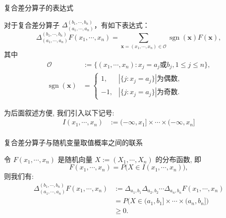 \documentclass[Prob-All.tex]{subfiles}
\begin{document}
\begin{frame}{复合差分算子的表达式}
\begin{thm}
对于复合差分算子 $\Delta_{\left(a_{1}, \cdots, a_{n}\right)}^{\left(b_{1}, \cdots, b_{n}\right)}$，有如下表达式：
$$\Delta_{\left(a_{1}, \cdots, a_{n}\right)}^{\left(b_{1}, \cdots, b_{n}\right)} F(x_1,\cdots,x_n)=\sum_{\boldsymbol{x}=(x_1,\cdots, x_n)\in\mathcal{O}} \operatorname{sgn}(\boldsymbol{x}) F(\boldsymbol{x}),$$
			其中 \vspace{-0.5cm}
			\begin{align*}
				\mathcal{O}&:=\{(x_1,\cdots,x_n): x_j=a_j\mbox{或} b_j, 1\leq j\leq n\},\\
				\operatorname{sgn}(\boldsymbol{x})&=\left\{
				\begin{array}{ll}
					1,& |\{j:x_j=a_j\}|\mbox{为偶数},\\
					-1, &|\{j:x_j=a_j\}|\mbox{为奇数}.
					\end{array}\right.
			\end{align*}
\end{thm}

\pause

为后面叙述方便, 我们引入以下记号:
\begin{align*}
  I(x_1,\cdots,x_n)&:= (-\infty, x_1]\times\cdots\times (-\infty, x_n]\\
\end{align*}

\end{frame}

\begin{frame}{复合差分算子与随机变量取值概率之间的联系}
\begin{thm} 令 $F(x_1,\cdots,x_n)$ 是随机向量 $X:=\left (X_1,\cdots ,X_n \right)$ 的分布函数, 即
		$$
		F\left( x_1,\cdots ,x_n \right) =P\big( X\in I(x_1,\cdots,x_n) \big),
		$$
则我们有:
\begin{align*}
  \Delta_{\left(a_{1}, \cdots, a_{n}\right)}^{\left(b_{1}, \cdots, b_{n}\right)} F(x_1,\cdots,x_n) &:=\Delta_{a_{1}, b_{1}} \Delta_{a_{2}, b_{2}} \cdots \Delta_{a_{n}, b_{n}} F\left(x_{1}, \cdots, x_{n}\right) \\
  &=P\big( X\in (a_1,b_1]\times\cdots\times (a_n,b_n]\big)\\
  & \geq 0.
\end{align*}


\end{thm}







\end{frame}
\end{document}
